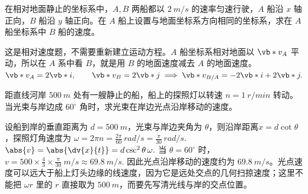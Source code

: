 \begin{exercise}
在相对地面静止的坐标系中，\(A,B\) 两船都以 \(\SI{2}{m/s}\) 的速率匀速行驶，\(A\) 船沿 \(x\) 轴正向，\(B\) 船沿 \(y\) 轴正向。在 \(A\) 船上设置与地面坐标系方向相同的坐标系，求在 \(A\) 船坐标系中 \(B\) 船的速度。
\end{exercise}

\begin{solution}
这是相对速度题，不需要重新建立运动方程。\(A\) 船坐标系相对地面以 \(\vb*{v}_A\) 平动，所以在 \(A\) 系中看 \(B\)，就是用 \(B\) 的地面速度减去 \(A\) 的地面速度。
 \(\vb*{v}_A=2\vb*{i},\qquad \vb*{v}_B=2\vb*{j} \implies \vb*{v}_{B/A}=-2\vb*{i}+2\vb*{j}.\) 
\end{solution}


\begin{exercise}
距直线河岸 \(\SI{500}{m}\) 处有一艘静止的船，船上的探照灯以转速 \(n=\SI{1}{r/min}\) 转动。当光束与岸边成 \(60^\circ\) 角时，求光束在岸边光点沿岸移动的速度。
\end{exercise}

\begin{solution}
设船到岸的垂直距离为 \(d=\SI{500}{m}\)，光束与岸边夹角为 \(\theta\)，则沿岸距离$x=d\cot\theta$，探照灯角速度为
 \(\omega=2\pi n=\frac{2\pi}{60}\,\si{rad/s}=\frac{\pi}{30}\,\si{rad/s}.\) 
 \(\abs{v}=\abs{\dv{x}{t}} =d\csc^2\theta\,\omega.\) 
当 \(\theta=60^\circ\) 时，
 \(v=500\times \frac{4}{3}\times\frac{\pi}{30}\ \si{m/s} \approx \SI{69.8}{m/s}.\) 
因此光点沿岸移动的速度约为 \(\SI{69.8}{m/s}\)。光点速度可以远大于船上灯头边缘的线速度，因为它是远处交点的几何扫掠速度；这里不能把 \(\omega r\) 里的 \(r\) 直接取为 \(\SI{500}{m}\)，而要先写清光线与岸的交点位置。
\end{solution}
